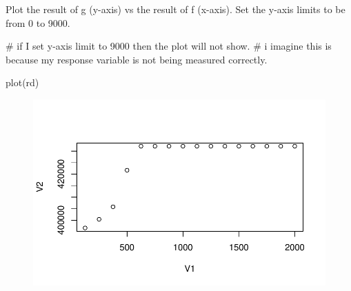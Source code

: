\documentclass[
  letterpaper,
  DIV=11,
  numbers=noendperiod]{scrartcl}
\newenvironment{Shaded}{\begin{snugshade}}{\end{snugshade}}
\newcommand{\CommentTok}[1]{\textcolor[rgb]{0.37,0.37,0.37}{#1}}
\newcommand{\FunctionTok}[1]{\textcolor[rgb]{0.28,0.35,0.67}{#1}}
\newcommand{\NormalTok}[1]{\textcolor[rgb]{0.00,0.23,0.31}{#1}}
\begin{document}
Plot the result of g (y-axis) vs the result of f (x-axis). Set the
y-axis limits to be from 0 to 9000.

\begin{Shaded}
\begin{Highlighting}[]
\CommentTok{\# if I set y{-}axis limit to 9000 then the plot will not show.}
\CommentTok{\# i imagine this is because my response variable is not being measured correctly.}

\FunctionTok{plot}\NormalTok{(rd)}
\end{Highlighting}
\end{Shaded}

\begin{figure}[H]

{\centering \includegraphics{geo-hw-spdep_files/figure-pdf/unnamed-chunk-17-1.pdf}

}

\end{figure}
\end{document}
